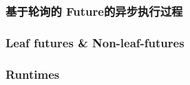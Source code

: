 % 
\begin{frame}[fragile]
    \frametitle{基于轮询的 Future的异步执行过程}
\end{frame}
% 
% 
% 
\begin{frame}[fragile]
    \frametitle{Leaf futures \& Non-leaf-futures}
\end{frame}
% 
% 
% 
% 
% 
% 
% 
\begin{frame}[fragile]
    \frametitle{Runtimes}
\end{frame}
% 
